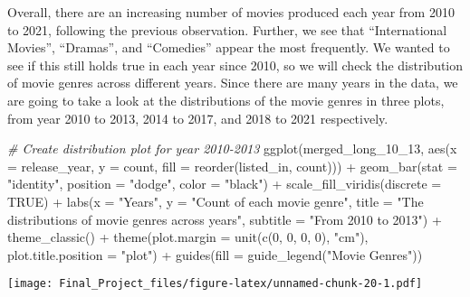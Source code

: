 \documentclass[
]{article}
\newenvironment{Shaded}{\begin{snugshade}}{\end{snugshade}}
\newcommand{\AttributeTok}[1]{\textcolor[rgb]{0.77,0.63,0.00}{#1}}
\newcommand{\CommentTok}[1]{\textcolor[rgb]{0.56,0.35,0.01}{\textit{#1}}}
\newcommand{\ConstantTok}[1]{\textcolor[rgb]{0.00,0.00,0.00}{#1}}
\newcommand{\DecValTok}[1]{\textcolor[rgb]{0.00,0.00,0.81}{#1}}
\newcommand{\FunctionTok}[1]{\textcolor[rgb]{0.00,0.00,0.00}{#1}}
\newcommand{\NormalTok}[1]{#1}
\newcommand{\SpecialCharTok}[1]{\textcolor[rgb]{0.00,0.00,0.00}{#1}}
\newcommand{\StringTok}[1]{\textcolor[rgb]{0.31,0.60,0.02}{#1}}
\begin{document}
Overall, there are an increasing number of movies produced each year
from 2010 to 2021, following the previous observation. Further, we see
that ``International Movies'', ``Dramas'', and ``Comedies'' appear the
most frequently. We wanted to see if this still holds true in each year
since 2010, so we will check the distribution of movie genres across
different years. Since there are many years in the data, we are going to
take a look at the distributions of the movie genres in three plots,
from year 2010 to 2013, 2014 to 2017, and 2018 to 2021 respectively.

\begin{Shaded}
\begin{Highlighting}[]
\CommentTok{\# Create distribution plot for year 2010{-}2013}
\FunctionTok{ggplot}\NormalTok{(merged\_long\_10\_13, }\FunctionTok{aes}\NormalTok{(}\AttributeTok{x =}\NormalTok{ release\_year, }\AttributeTok{y =}\NormalTok{ count, }\AttributeTok{fill =} \FunctionTok{reorder}\NormalTok{(listed\_in, count))) }\SpecialCharTok{+} 
  \FunctionTok{geom\_bar}\NormalTok{(}\AttributeTok{stat =} \StringTok{"identity"}\NormalTok{,}
           \AttributeTok{position =} \StringTok{"dodge"}\NormalTok{,}
           \AttributeTok{color =} \StringTok{"black"}\NormalTok{) }\SpecialCharTok{+} 
  \FunctionTok{scale\_fill\_viridis}\NormalTok{(}\AttributeTok{discrete =} \ConstantTok{TRUE}\NormalTok{) }\SpecialCharTok{+}
  \FunctionTok{labs}\NormalTok{(}\AttributeTok{x =} \StringTok{"Years"}\NormalTok{,}
       \AttributeTok{y =} \StringTok{"Count of each movie genre"}\NormalTok{,}
       \AttributeTok{title =} \StringTok{"The distributions of movie genres across years"}\NormalTok{,}
       \AttributeTok{subtitle =} \StringTok{"From 2010 to 2013"}\NormalTok{) }\SpecialCharTok{+}
  \FunctionTok{theme\_classic}\NormalTok{() }\SpecialCharTok{+}
  \FunctionTok{theme}\NormalTok{(}\AttributeTok{plot.margin =} \FunctionTok{unit}\NormalTok{(}\FunctionTok{c}\NormalTok{(}\DecValTok{0}\NormalTok{, }\DecValTok{0}\NormalTok{, }\DecValTok{0}\NormalTok{, }\DecValTok{0}\NormalTok{), }\StringTok{"cm"}\NormalTok{),}
        \AttributeTok{plot.title.position =} \StringTok{"plot"}\NormalTok{) }\SpecialCharTok{+}
  \FunctionTok{guides}\NormalTok{(}\AttributeTok{fill =} \FunctionTok{guide\_legend}\NormalTok{(}\StringTok{"Movie Genres"}\NormalTok{))}
\end{Highlighting}
\end{Shaded}

\texttt{[image: Final\_Project\_files/figure-latex/unnamed-chunk-20-1.pdf]}
\end{document}
